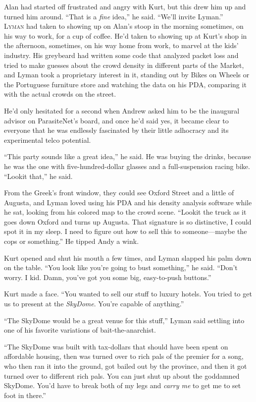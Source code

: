 \documentclass{article}
\begin{document}
Alan had started off frustrated and angry with Kurt, but this drew him
up and turned him around.  ``That is a \textit{fine} idea,'' he said. 
``We'll invite Lyman.''
\\
\lettrine[lines=3, lhang=.5, nindent=0pt, findent=2pt]{L}{yman} had taken to showing up on Alan's stoop in the morning
sometimes, on his way to work, for a cup of coffee.  He'd taken to
showing up at Kurt's shop in the afternoon, sometimes, on his way home
from work, to marvel at the kids' industry.  His greybeard had written
some code that analyzed packet loss and tried to make guesses about
the crowd density in different parts of the Market, and Lyman took a
proprietary interest in it, standing out by Bikes on Wheels or the
Portuguese furniture store and watching the data on his PDA, comparing
it with the actual crowds on the street.

He'd only hesitated for a second when Andrew asked him to be the
inaugural advisor on ParasiteNet's board, and once he'd said yes, it
became clear to everyone that he was endlessly fascinated by their
little adhocracy and its experimental telco potential.

``This party sounds like a great idea,'' he said.  He was buying the
drinks, because he was the one with five-hundred-dollar glasses and a
full-suspension racing bike.  ``Lookit that,'' he said.

From the Greek's front window, they could see Oxford Street and a
little of Augusta, and Lyman loved using his PDA and his density
analysis software while he sat, looking from his colored map to the
crowd scene.  ``Lookit the truck as it goes down Oxford and turns up
Augusta.  That signature is so distinctive, I could spot it in my
sleep.  I need to figure out how to sell this to someone---maybe the
cops or something.'' He tipped Andy a wink.

Kurt opened and shut his mouth a few times, and Lyman slapped his palm
down on the table.  ``You look like you're going to bust something,''
he said.  ``Don't worry.  I kid.  Damn, you've got you some big,
easy-to-push buttons.''

Kurt made a face.  ``You wanted to sell our stuff to luxury hotels. 
You tried to get us to present at the \textit{SkyDome}.  You're
capable of anything.''

``The SkyDome would be a great venue for this stuff,'' Lyman said
settling into one of his favorite variations of bait-the-anarchist.

``The SkyDome was built with tax-dollars that should have been spent
on affordable housing, then was turned over to rich pals of the
premier for a song, who then ran it into the ground, got bailed out by
the province, and then it got turned over to different rich pals.  You
can just shut up about the goddamned SkyDome.  You'd have to break
both of my legs and \textit{carry me} to get me to set foot in
there.''
\end{document}
